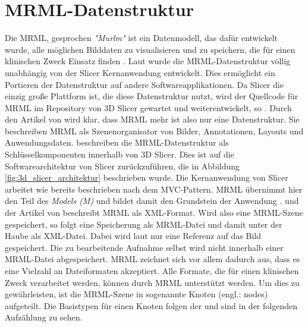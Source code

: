 \section{MRML-Datenstruktur}
\label{subsec:mrml_datenstruktur} Die \ac{MRML}, gesprochen \textit{"Murlm"} ist
ein Datenmodell, das dafür entwickelt wurde, alle möglichen Bilddaten zu
visualisieren und zu speichern, die für einen klinischen Zweck Einsatz finden \citep[vgl.][]{slicer2024}.
Laut \citet{slicer2024} wurde die \ac{MRML}-Datenstruktur völlig unabhängig von der
Slicer Kernanwendung entwickelt. Dies ermöglicht ein Portieren der Datenstruktur
auf andere Softwareapplikationen. Da Slicer die einzig große Plattform ist, die
diese Datenstruktur nutzt, wird der Quellcode für \ac{MRML} im Repository von 3D
Slicer gewartet und weiterentwickelt, so \citet{slicer2024}. Durch den Artikel von
\citet[S.~1331]{fedorov2012slicer} wird klar, dass \ac{MRML} mehr ist also nur
eine Datenstruktur. Sie beschreiben \ac{MRML} als Szenenorganisator von Bilder, Annotationen,
Layouts und Anwendungsdaten. \citet[S.~1327]{fedorov2012slicer} beschreiben die
\ac{MRML}-Datenstruktur als Schlüsselkomponenten innerhalb von 3D Slicer. Dies
ist auf die Softwarearchitektur von Slicer zurückzuführen, die in Abbildung \ref{fig:3d_slicer_architektur}
beschrieben wurde. Die Kernanwendung von Slicer arbeitet wie bereits beschrieben
nach dem \ac{MVC}-Pattern. \ac{MRML} übernimmt hier den Teil des \textit{Models
(M)} und bildet damit den Grundstein der Anwendung \citep[vgl.][S.~1332]{fedorov2012slicer}.
\citet{slicer2024} und der Artikel von \citet[S.~1327]{fedorov2012slicer}
beschreibt \ac{MRML} als \ac{XML}-Format. Wird also eine \ac{MRML}-Szene
gespeichert, so folgt eine Speicherung als \ac{MRML}-Datei und damit unter der
Haube als \ac{XML}-Datei. Dabei wird laut \citet{slicer2024} nur eine Referenz auf
das Bild gespeichert. Die zu bearbeitende Aufnahme selbst wird nicht innerhalb
einer \ac{MRML}-Datei abgespeichert. \ac{MRML} zeichnet sich vor allem dadurch aus,
dass es eine Vielzahl an Dateiformaten akzeptiert. Alle Formate, die für einen
klinischen Zweck verarbeitet werden, können durch \ac{MRML} unterstützt werden. Um
dies zu gewährleisten, ist die \ac{MRML}-Szene in sogenannte Knoten (engl.:
nodes) aufgeteilt. Die Basistypen für einen Knoten folgen der \citet{slicer2024}
und sind in der folgenden Aufzählung zu sehen.

